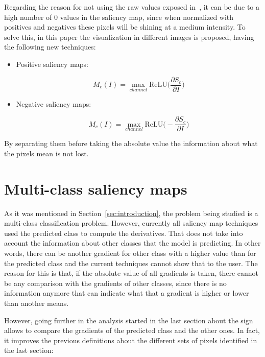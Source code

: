 \documentclass[preprint,12pt]{elsarticle}
\begin{document}
Regarding the reason for not using the raw values exposed in~\cite{Smilkov2017}, it can be due to a high number of 0 values in the saliency map, since when normalized with positives and negatives these pixels will be shining at a medium intensity. To solve this, in this paper the visualization in different images is proposed, having the following new techniques:

\begin{itemize}
    \item Positive saliency maps:
    
    \begin{equation}
        M_c(I) = \max_{channel} \text{ReLU} \bigg (\frac{\partial S_c}{\partial I} \bigg )
        \label{eq: positive saliency map}
    \end{equation}

    \item Negative saliency maps:
    
    \begin{equation}
        M_c(I) = \max_{channel} \text{ReLU} \bigg (-\frac{\partial S_c}{\partial I} \bigg )
        \label{eq: negative saliency map}
    \end{equation}

\end{itemize}

By separating them before taking the absolute value the information about what the pixels mean is not lost. 

\section{Multi-class saliency maps}
\label{sec:multi-class saliency map}
As it was mentioned in Section~\ref{sec:introduction}, the problem being studied is a multi-class classification problem. However, currently all saliency map techniques used the predicted class to compute the derivatives. That does not take into account the information about other classes that the model is predicting. In other words, there can be another gradient for other class with a higher value than for the predicted class and the current techniques cannot show that to the user. The reason for this is that, if the absolute value of all gradients is taken, there cannot be any comparison with the gradients of other classes, since there is no information anymore that can indicate what that a gradient is higher or lower than another means.

However, going further in the analysis started in the last section about the sign allows to compare the gradients of the predicted class and the other ones. In fact, it improves the previous definitions about the different sets of pixels identified in the last section:
\end{document}
